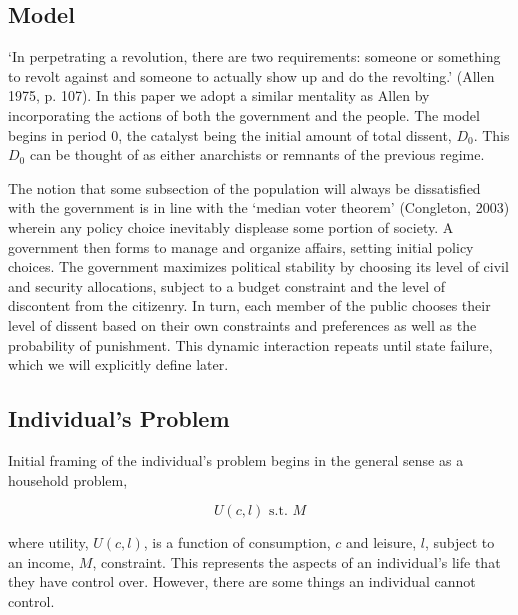 \documentclass[12pt]{article}
\begin{document}
\begin{spacing}{1.5}
\subsection{Model}



`In perpetrating a revolution, there are two requirements: someone or something to revolt against and someone to actually show up and do the revolting.' (Allen 1975, p. 107). In this paper we adopt a similar mentality as Allen by incorporating the actions of both the government and the people. The model begins in period 0, the catalyst being the initial amount of total dissent, $D_0$. This $D_0$ can be thought of as either anarchists or remnants of the previous regime. %

The notion that some subsection of the population will always be dissatisfied with the government is in line with the `median voter theorem' (Congleton, 2003) wherein any policy choice inevitably displease some portion of society. A government then forms to manage and organize affairs, setting initial policy choices. The government maximizes political stability by choosing its level of civil and security allocations, subject to a budget constraint and the level of discontent from the citizenry. In turn, each member of the public chooses their level of dissent based on their own constraints and preferences as well as the probability of punishment. This dynamic interaction repeats until state failure, which we will explicitly define later. 

 
\subsection{Individual's Problem}

Initial framing of the individual's problem begins in the general sense as a household problem, 

\begin{equation}
	U(c,l) \text{ s.t. } M %
\end{equation}

\noindent where utility, $U(c,l)$, is a function of consumption, $c$ and leisure, $l$, subject to an income, $M$,  constraint. This represents the aspects of an individual's life that they have control over. However, there are some things an individual cannot control.  


\end{spacing}
\end{document}
